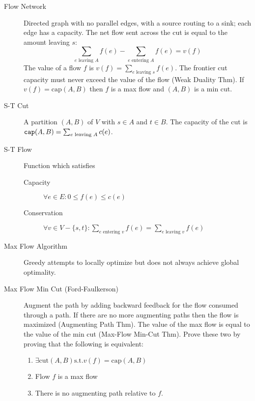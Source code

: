 \documentclass[8pt]{article}
\begin{document}

\begin{multicols}{2}
  \begin{description}
  \item [Flow Network] Directed graph with no parallel edges, with a
    source routing to a sink; each edge has a capacity.
    The net flow sent across the cut is equal to the amount leaving
    $s$:
    $$\sum_{e \text{ leaving } A}f(e) - \sum_{e \text{ entering }
      A}f(e) = v(f)$$
    The value of a flow $f$ is $v(f) = \sum_{e \text{ leaving } s}f(e)$.
    The frontier cut capacity must never exceed the value of the flow
    (Weak Duality Thm).
    If $v(f) = \text{cap}(A,B)$ then $f$ is a max flow and $(A,B)$ is
    a min cut.
  \item [S-T Cut] A partition $(A, B)$ of $V$ with $s \in A$ and $t
    \in B$. The capacity of the cut is $\verb|cap|(A,B)=\sum_{e \text{
      leaving } A}c(e)$.
  \item [S-T Flow] Function which satisfies
    \begin{description}
    \item [Capacity] $\forall e \in E: 0 \le f(e) \le c(e)$
    \item [Conservation] $\forall v \in V- \{s,t\}: \sum_{e\text{ entering
      } v}f(e) = \sum_{e \text{ leaving } v} f(e)$
    \end{description}
  \item [Max Flow Algorithm] Greedy attempts to locally optimize but
    does not always achieve global optimality.
  \item [Max Flow Min Cut (Ford-Faulkerson)] Augment the path by
    adding backward feedback for the flow consumed through a path. If
    there are no more augmenting paths then the flow is maximized
    (Augmenting Path Thm). The value of the max flow is equal to the
    value of the min cut (Max-Flow Min-Cut Thm). Prove these two by
    proving that the following is equivalent:
    \begin{enumerate}
      \item $\exists \text{cut} (A,B) \text{s.t.} v(f) = \text{cap}(A,B)$
      \item Flow $f$ is a max flow
      \item There is no augmenting path relative to $f$.
    \end{enumerate}
  \end{description} %
\end{multicols}
\end{document}

